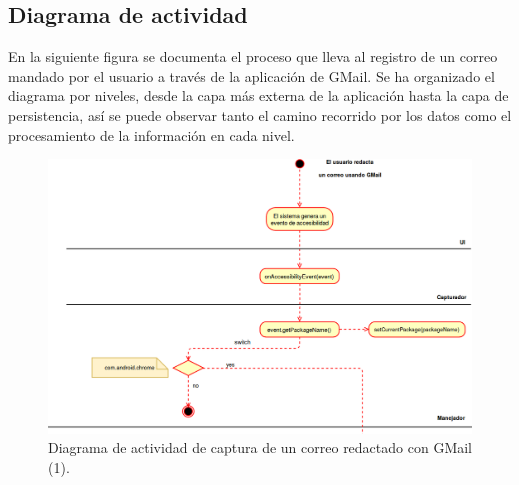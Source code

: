 \documentclass[12pt,a4paper,oneside]{book} %
\begin{document}
\subsection{Diagrama de actividad}
En la siguiente figura se documenta el proceso que lleva al registro de un correo mandado por el usuario a través de la aplicación de GMail. Se ha organizado el diagrama por niveles, desde la capa más externa de la aplicación hasta la capa de persistencia, así se puede observar tanto el camino recorrido por los datos como el procesamiento de la información en cada nivel.
\begin{landscape}
\begin{figure}[htb]
	\begin{center}
		\includegraphics[width=1.1\textwidth]{pictures/activity/gmailActivityDiagram1.png} 
	  \caption[Diagrama actividad GMail (1)]{Diagrama de actividad de captura de un correo redactado con GMail (1).}
	  \label{fig:Diagrama actividad GMail (1)}
  	\end{center}
\end{figure}
\end{landscape}
\end{document}
